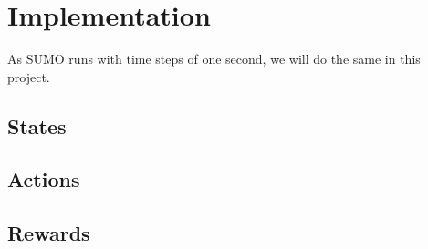 \section{Implementation}

As SUMO runs with time steps of one second, we will do the same in this project. 

\subsection{States}
\subsection{Actions}
\subsection{Rewards}

